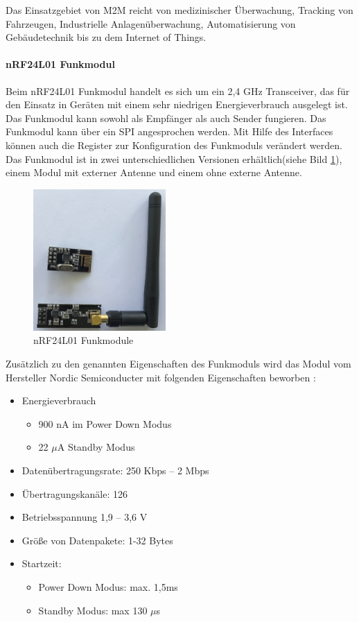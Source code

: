 Das Einsatzgebiet von M2M reicht von medizinischer Überwachung, Tracking von Fahrzeugen, Industrielle Anlagenüberwachung, Automatisierung von Gebäudetechnik bis zu dem Internet of Things.

\paragraph{nRF24L01 Funkmodul} Beim nRF24L01 Funkmodul handelt es sich um ein 2,4 GHz Transceiver, das für den Einsatz in Geräten mit einem sehr niedrigen Energieverbrauch ausgelegt ist. Das Funkmodul kann sowohl als Empfänger als auch Sender fungieren. Das Funkmodul kann über ein \ac{SPI} angesprochen werden. Mit Hilfe des Interfaces können auch die Register zur Konfiguration des Funkmoduls verändert werden. Das Funkmodul ist in zwei unterschiedlichen Versionen erhältlich(siehe Bild \ref{img:RF24Funkmodul}), einem Modul mit externer Antenne und einem ohne externe Antenne.

\begin{figure} [!p]
	\centering
	\includegraphics[width=0.45\textwidth]{bilder/RF24Funkmodul}
	\caption{nRF24L01 Funkmodule}
	\label{img:RF24Funkmodul}
\end{figure}
Zusätzlich zu den genannten Eigenschaften des Funkmoduls wird das Modul vom Hersteller Nordic Semiconducter mit folgenden Eigenschaften beworben \cite{semiconductor2007nrf24l01}:
\begin{itemize}
\item Energieverbrauch
\begin{itemize}
\item 900 nA im Power Down Modus
\item 22 $\mu$A Standby Modus
\end{itemize}
\item Datenübertragungsrate: 250 Kbps – 2 Mbps
\item Übertragungskanäle: 126
\item Betriebsspannung 1,9 – 3,6 V
\item Größe von Datenpakete: 1-32 Bytes
\item Startzeit:
\begin{itemize}
\item Power Down Modus: max. 1,5ms
\item Standby Modus: max 130 $\mu$s
\end{itemize}
\end{itemize}
